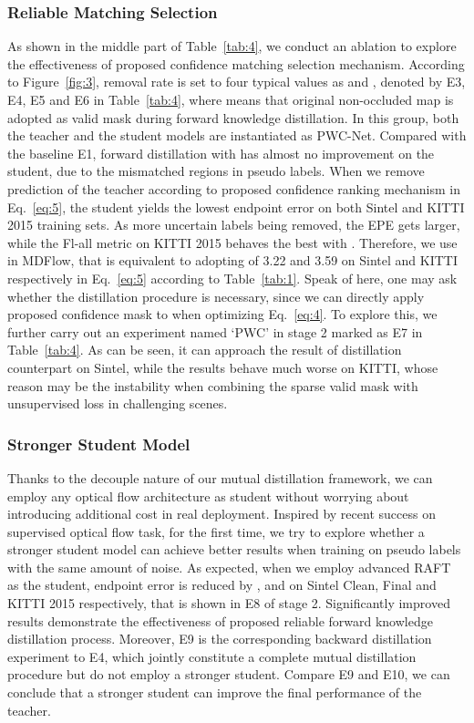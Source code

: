 \documentclass[lettersize,journal]{IEEEtran}
\begin{document}
\subsubsection{Reliable Matching Selection}
As shown in the middle part of Table~\ref{tab:4}, we conduct an ablation to explore the effectiveness of proposed confidence matching selection mechanism. According to Figure~\ref{fig:3}, removal rate is set to four typical values as  and , denoted by E3, E4, E5 and E6 in Table~\ref{tab:4}, where  means that original non-occluded map is adopted as valid mask during forward knowledge distillation. In this group, both the teacher and the student models are instantiated as PWC-Net. Compared with the baseline E1, forward distillation with  has almost no improvement on the student, due to the mismatched regions in pseudo labels. When we remove  prediction of the teacher according to proposed confidence ranking mechanism in Eq.~\ref{eq:5}, the student yields the lowest endpoint error on both Sintel and KITTI 2015 training sets. As more uncertain labels being removed, the EPE gets larger, while the Fl-all metric on KITTI 2015 behaves the best with . Therefore, we use  in MDFlow, that is equivalent to adopting  of 3.22 and 3.59 on Sintel and KITTI respectively in Eq.~\ref{eq:5} according to Table~\ref{tab:1}. Speak of here, one may ask whether the distillation procedure is necessary, since we can directly apply proposed confidence mask to  when optimizing Eq.~\ref{eq:4}. To explore this, we further carry out an experiment named `PWC' in stage 2 marked as E7 in Table~\ref{tab:4}. As can be seen, it can approach the result of distillation counterpart on Sintel, while the results behave much worse on KITTI, whose reason may be the instability when combining the sparse valid mask with unsupervised loss in challenging scenes.

\subsubsection{Stronger Student Model}
Thanks to the decouple nature of our mutual distillation framework, we can employ any optical flow architecture as student without worrying about introducing additional cost in real deployment. Inspired by recent success on supervised optical flow task, for the first time, we try to explore whether a stronger student model can achieve better results when training on pseudo labels with the same amount of noise. As expected, when we employ advanced RAFT~\cite{teed2020raft} as the student, endpoint error is reduced by ,  and  on Sintel Clean, Final and KITTI 2015 respectively, that is shown in E8 of stage 2. Significantly improved results demonstrate the effectiveness of proposed reliable forward knowledge distillation process. Moreover, E9 is the corresponding backward distillation experiment to E4, which jointly constitute a complete mutual distillation procedure but do not employ a stronger student. Compare E9 and E10, we can conclude that a stronger student can improve the final performance of the teacher.
\end{document}
